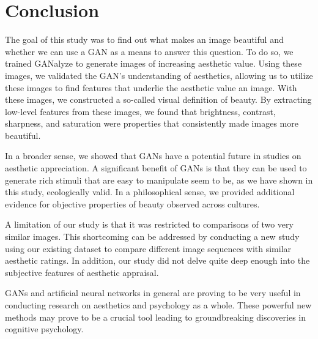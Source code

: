 \documentclass[../main.tex]{subfiles}
\begin{document}
\section{Conclusion}
The goal of this study was to find out what makes an image beautiful and whether we can use a GAN as a means to answer this question. To do so, we trained GANalyze to generate images of increasing aesthetic value. Using these images, we validated the GAN's understanding of aesthetics, allowing us to utilize these images to find features that underlie the aesthetic value an image. With these images, we constructed a so-called visual definition of beauty. By extracting low-level features from these images, we found that brightness, contrast, sharpness, and saturation were properties that consistently made images more beautiful.

In a broader sense, we showed that GANs have a potential future in studies on aesthetic appreciation. A significant benefit of GANs is that they can be used to generate rich stimuli that are easy to manipulate seem to be, as we have shown in this study, ecologically valid. In a philosophical sense, we provided additional evidence for objective properties of beauty observed across cultures.

A limitation of our study is that it was restricted to comparisons of two very similar images. This shortcoming can be addressed by conducting a new study using our existing dataset to compare different image sequences with similar aesthetic ratings. In addition, our study did not delve quite deep enough into the subjective features of aesthetic appraisal.

GANs and artificial neural networks in general are proving to be very useful in conducting research on aesthetics and psychology as a whole. These powerful new methods may prove to be a crucial tool leading to groundbreaking discoveries in cognitive psychology.
\end{document}
